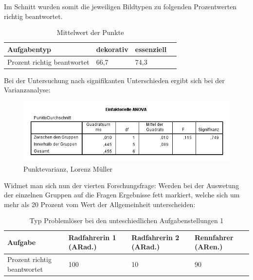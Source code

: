 Im Schnitt wurden somit die jeweiligen Bildtypen zu folgenden Prozentwerten richtig beantwortet. 

\begin{table}[!h]
\hspace{-5pt}
\begin{tabularx}{\textwidth + 5pt}{| @{\hspace{3pt}} M || @{\hspace{3pt}} M  | @{\hspace{3pt}} M | @{\hspace{3pt}} M |}
\hline
\textbf{Aufgabentyp} & \textbf{dekorativ} & \textbf{essenziell} \\
\hline
\hline
Prozent richtig beantwortet       & 66,7 & 74,3 \\
\hline
\end{tabularx}
\caption{Mittelwert der Punkte}
\end{table}

Bei der Untersuchung nach signifikanten Unterschieden ergibt sich bei der Varianzanalyse:


\begin{figure}[!ht]
\noindent\hspace{0.5mm}\includegraphics[width=15cm]{./Ressourcen/Aufgabenuntescheidung.png}
\caption{Punktevarianz, Lorenz Müller}
\end{figure}




Widmet man sich nun der vierten Forschungsfrage:
Werden bei der Auswetung der einzelnen Gruppen auf die Fragen Ergebnisse fett markiert, welche sich um mehr als 20 Prozent vom Wert der Allgemeinheit unterscheiden:

\begin{table}[!h]
\hspace{-5pt}
\begin{tabularx}{\textwidth + 5pt}{| @{\hspace{3pt}} M || @{\hspace{3pt}} M  | @{\hspace{3pt}} M | @{\hspace{3pt}} M |}
\hline
\textbf{Aufgabe} & \textbf{Radfahrerin 1 (ARad.)} & \textbf{Radfahrerin 2 (ARad.)} & \textbf{Rennfahrer (ARen.)} \\
\hline
\hline
Prozent richtig beantwortet       & 100 & 10 & 90 \\
\hline
\end{tabularx}
\caption{Typ Problemlöser bei den unteschiedlichen Aufgabenstellungen 1}
\end{table}


